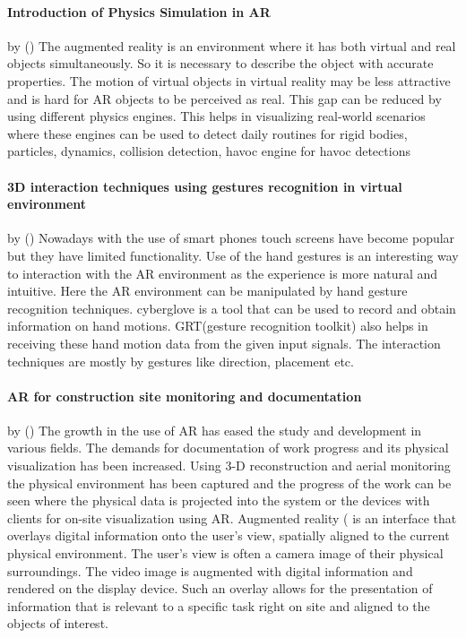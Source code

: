 \documentclass[BTech]{srmuthesis}
\begin{document}
\paragraph{Introduction of Physics Simulation in AR} by (\cite{introphysics})
The augmented reality is an environment where it has both
virtual and real objects simultaneously. So it is necessary to
describe the object with accurate properties. The motion of
virtual objects in virtual reality may be less attractive and is
hard for AR objects to be perceived as real. This gap can be
reduced by using different physics engines. This helps in visualizing
real-world scenarios where these engines can be used
to detect daily routines for rigid bodies, particles, dynamics,
collision detection, havoc engine for havoc detections

\paragraph{3D interaction techniques using gestures recognition in virtual environment} by (\cite{gestureinteraction})
Nowadays with the use of smart phones touch screens have
become popular but they have limited functionality. Use of the
hand gestures is an interesting way to interaction with the AR
environment as the experience is more natural and intuitive.
Here the AR environment can be manipulated by hand gesture
recognition techniques\cite{gestureinteraction}. cyberglove is a tool that can be
used to record and obtain information on hand motions.
GRT(gesture recognition toolkit) also helps in receiving these
hand motion data from the given input signals. The interaction
techniques are mostly by gestures like direction, placement etc.

\paragraph{AR for construction site monitoring and documentation} by (\cite{sitemonitoring})
The growth in the use of AR has eased the study and development in various fields. The demands for documentation of work progress and its physical visualization has been increased. Using 3-D reconstruction and aerial monitoring the physical environment has been captured and the progress of the work can be seen where the physical data is projected into the system or the devices with clients for on-site visualization using AR. Augmented reality ( is an interface that overlays digital information onto the user's view, spatially aligned to the current physical environment. The user's view is often a camera image of their physical surroundings. The video image is augmented with digital information and rendered on the display device. Such an overlay allows for the presentation of information that is relevant to a specific task right on site and aligned to the objects of interest.
\end{document}
